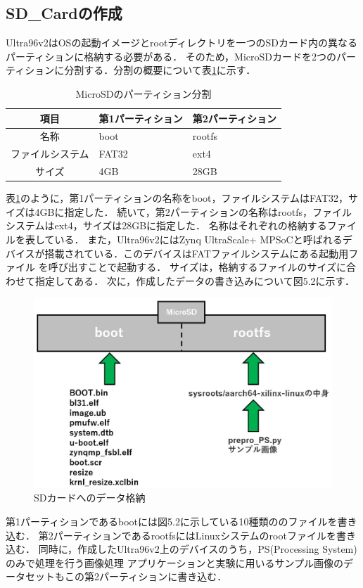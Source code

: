 \documentclass[11pt,a4j]{jreport}
\begin{document}
\subsection{SD_Cardの作成}
Ultra96v2はOSの起動イメージとrootディレクトリを一つのSDカード内の異なるパーティションに格納する必要がある．
そのため，MicroSDカードを2つのパーティションに分割する．分割の概要について表\ref{SDpartition}に示す．
\begin{table}[H]
  \caption{MicroSDのパーティション分割}
  \label{SDpartition}
  \centering
  \begin{tabular}{|c|l|l|}
    \hline
    項目 & 第1パーティション & 第2パーティション \\
    \hline \hline
    名称 & boot & rootfs \\
    ファイルシステム & FAT32 & ext4 \\
    サイズ & 4GB & 28GB \\
    \hline
    \end{tabular}
\end{table}
表\ref{SDpartition}のように，第1パーティションの名称をboot，ファイルシステムはFAT32，サイズは4GBに指定した．
続いて，第2パーティションの名称はrootfs，ファイルシステムはext4，サイズは28GBに指定した．
名称はそれぞれの格納するファイルを表している．
また，Ultra96v2にはZynq UltraScale+ MPSoCと呼ばれるデバイスが搭載されている．このデバイスはFATファイルシステムにある起動用ファイル
を呼び出すことで起動する．
サイズは，格納するファイルのサイズに合わせて指定してある．
次に，作成したデータの書き込みについて図5.2に示す．
\begin{figure}[H]
  \center
  \includegraphics[scale = 0.7]{pict/pict10.jpg}
  \caption{SDカードへのデータ格納}
\end{figure}
第1パーティションであるbootには図5.2に示している10種類ののファイルを書き込む．
第2パーティションであるrootfsにはLinuxシステムのrootファイルを書き込む．
同時に，作成したUltra96v2上のデバイスのうち，PS(Processing System)のみで処理を行う画像処理
アプリケーションと実験に用いるサンプル画像のデータセットもこの第2パーティションに書き込む．
\end{document}
